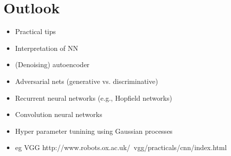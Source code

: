 \documentclass[12pt,a4paper]{article}
\begin{document}
\section{Outlook}
\begin{itemize}\setlength\itemsep{0em}
\item Practical tips \cite{2012arXiv1206.5533B, Hinton2012Practical, DBLP:series/lncs/7700} 
\item Interpretation of NN \cite{2017arXiv170607979M, KinSchAlbMueErhKimDae18}
\item (Denoising) autoencoder 
\item Adversarial nets (generative vs. discriminative)
\item Recurrent neural networks (e.g., Hopfield networks)
\item Convolution neural networks 
\item Hyper parameter tunining using Gaussian processes
\item eg VGG http://www.robots.ox.ac.uk/~vgg/practicals/cnn/index.html
\end{itemize}


\end{document}
